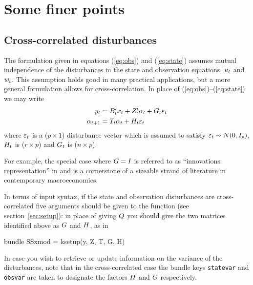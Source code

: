 
\section{Some finer points}
\label{sec:finer}

\subsection{Cross-correlated disturbances}
\label{sec:crossd}

The formulation given in equations (\ref{eq:obs}) and (\ref{eq:state})
assumes mutual independence of the disturbances in the state and
observation equations, $u_t$ and $w_t$.  This assumption
holds good in many practical applications, but a more general
formulation allows for cross-correlation.  In place of
(\ref{eq:obs})--(\ref{eq:state}) we may write
%
\begin{align*}
  y_t &= B_t'x_t + Z_t' \alpha_t + 
     G_t \varepsilon_t \\
  \alpha_{t+1} &= T_t \alpha_t + 
     H_t \varepsilon_t
\end{align*}
%
where $\varepsilon_t$ is a ($p \times 1$) disturbance vector which is
assumed to satisfy $\varepsilon_t \sim N(0, I_p)$, $H_t$ is
($r \times p$) and $G_t$ is ($n \times p$).

For example, the special case where $G = I$ is referred to as
``innovations representation'' in \cite{hansen-sargent2013} and is a
cornerstone of a sizeable strand of literature in contemporary
macroeconomics.

In terms of input syntax, if the state and observation disturbances
are cross-correlated five arguments should be given to the
 function (see section~\ref{sec:setup}): in place of
giving $Q$ you should give the two matrices identified above as
$G$ and $H$, as in
\begin{code}
bundle SSxmod = ksetup(y, Z, T, G, H)
\end{code}

In case you wish to retrieve or update information on the variance of
the disturbances, note that in the cross-correlated case the bundle
keys \texttt{statevar} and \texttt{obsvar} are taken to designate the
factors $H$ and $G$ respectively.

